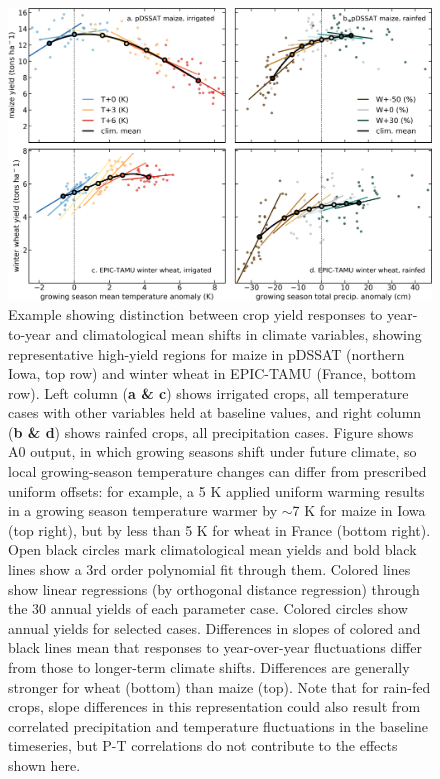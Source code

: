 \documentclass[gmd, manuscript]{copernicus} %
\begin{document}
\begin{figure}[ht]
\centering
   \includegraphics[width=15cm]{figures/phase_II_em_figure_1.png}
   \caption{
   Example showing distinction between crop yield responses to year-to-year and climatological mean shifts in climate variables, showing representative high-yield regions for maize in pDSSAT (northern Iowa, top row) and winter wheat in EPIC-TAMU (France, bottom row).
   Left column (\textbf{a \& c}) shows irrigated crops, all temperature cases %
   with other variables held at baseline values, and right column (\textbf{b \& d}) shows rainfed crops, all precipitation cases. %
   Figure shows A0 output, in which growing seasons shift under future climate, so local growing-season temperature changes can differ from prescribed uniform offsets: for example, a 5 K applied uniform warming results in a growing season temperature warmer by $\sim$7 K for maize in Iowa (top right), but by less than 5 K for wheat in France (bottom right). 
   Open black circles mark climatological mean yields and bold black lines show a 3rd order polynomial fit through them. 
   Colored lines show linear regressions (by orthogonal distance regression) through the 30 annual yields of each parameter case.
   Colored circles show annual yields for selected cases. %
   Differences in slopes of colored and black lines mean that responses to year-over-year fluctuations differ from those to longer-term climate shifts. Differences are generally stronger for wheat (bottom) than maize (top).
   Note that for rain-fed crops, slope differences in this representation could also result from correlated precipitation and temperature fluctuations in the baseline timeseries, but P-T correlations do not contribute to the effects shown here. 
}
\end{figure}
\end{document}
